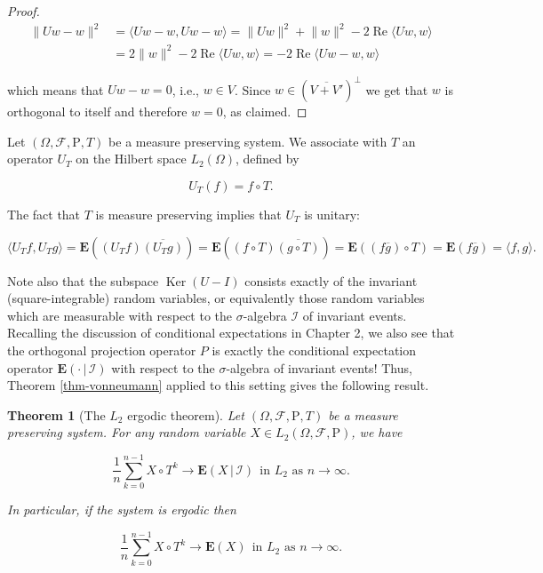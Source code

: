 \documentclass[11pt]{report}
\theoremstyle{plain}
\newtheorem{thm}{Theorem}[chapter]
\theoremstyle{definition}
\begin{document}
\begin{proof}
\begin{align*}
\lVert Uw-w \rVert^2 &= \langle Uw-w, Uw-w\rangle = \lVert Uw \rVert^2 + \lVert w \rVert^2 - 2\operatorname{Re} \langle Uw,w\rangle  \\ &=
2\lVert w \rVert^2 - 2\operatorname{Re} \langle Uw,w\rangle
= - 2\operatorname{Re} \langle Uw-w,w\rangle
\end{align*}

which means that $Uw-w = 0$, i.e., $w\in V$. Since $w\in \left(\overline{V+V'}\right)^\perp$ we get that $w$ is orthogonal to itself and therefore $w=0$, as claimed.
\end{proof}

Let $(\Omega, \mathcal{F}, \mathrm{P}, T)$ be a measure preserving system. We associate with $T$ an operator $U_T$ on the Hilbert space $L_2(\Omega)$, defined  by

\[
U_T(f) = f\circ T.
\]

The fact that $T$ is measure preserving implies that $U_T$ is unitary:

\[
\langle U_T f, U_T g \rangle = \mathbf{E}( (U_T f) \overline{(U_T g)} )
= \mathbf{E}( (f\circ T) \overline{(g\circ T)} )
= \mathbf{E}( (f\overline{g})\circ T ) = \mathbf{E}( f\overline{g} ) = \langle f,g\rangle.
\]

Note also that the subspace $\operatorname{Ker}(U-I)$ consists exactly of the invariant (square-integrable) random variables, or equivalently those random variables which are measurable with respect to the $\sigma$-algebra $\mathcal{I}$ of invariant events. Recalling the discussion of conditional expectations in Chapter 2, we also see that the orthogonal projection operator $P$ is exactly the conditional expectation operator $\mathbf{E}\left(\cdot\,|\,\mathcal{I}\right)$ with respect to the $\sigma$-algebra of invariant events! Thus, Theorem \ref{thm-vonneumann} applied to this setting gives the following result.

\begin{thm}[The $L_2$ ergodic theorem]
Let $(\Omega, \mathcal{F}, \mathrm{P}, T)$ be a measure preserving system. For any random variable $X\in L_2(\Omega, \mathcal{F}, \mathrm{P})$, we have

\[
\frac{1}{n} \sum_{k=0}^{n-1} X\circ T^{k} \to \mathbf{E}\left(X\,|\,\mathcal{I}\right)\ \ \textrm{in $L_2$ as }n\to\infty.
\]

In particular, if the system is ergodic then

\[
\frac{1}{n} \sum_{k=0}^{n-1} X\circ T^{k} \to \mathbf{E}(X)\ \ \textrm{in $L_2$ as }n\to\infty.
\]

\end{thm}
\end{document}

